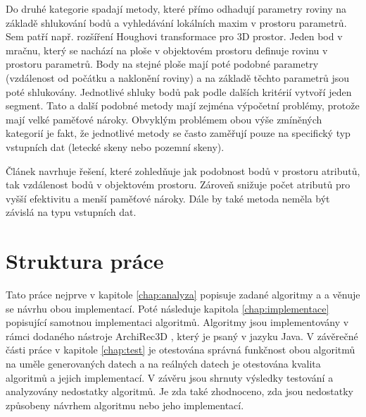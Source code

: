 \documentclass[11pt,twoside,a4paper]{book}
\begin{document}
Do druhé kategorie spadají metody, které přímo odhadují parametry roviny na základě shlukování bodů a vyhledávání lokálních maxim v prostoru parametrů. Sem patří např. rozšíření Houghovi transformace pro 3D prostor. Jeden bod v mračnu, který se nachází na ploše v objektovém prostoru definuje rovinu v prostoru parametrů. Body na stejné ploše mají poté podobné parametry (vzdálenost od počátku a naklonění roviny) a na základě těchto parametrů jsou poté shlukovány. Jednotlivé shluky bodů pak podle dalších kritérií vytvoří jeden segment. Tato a další podobné metody mají zejména výpočetní problémy, protože mají velké paměťové nároky. Obvyklým problémem obou výše zmíněných kategorií je fakt, že jednotlivé metody se často zaměřují pouze na specifický typ vstupních dat (letecké skeny nebo pozemní skeny).

Článek \cite{Seg01} navrhuje řešení, které zohledňuje jak podobnost bodů v prostoru atributů, tak vzdálenost bodů v objektovém prostoru. Zároveň snižuje počet atributů pro vyšší efektivitu a menší paměťové nároky. Dále by také metoda neměla být závislá na typu vstupních dat.


\section{Struktura práce}

Tato práce nejprve v kapitole \ref{chap:analyza} popisuje zadané algoritmy \cite{Seg01} a \cite{Seg02} a věnuje se návrhu obou implementací. Poté následuje kapitola \ref{chap:implementace} popisující samotnou implementaci algoritmů. Algoritmy jsou implementovány v rámci dodaného nástroje ArchiRec3D \cite{AR3D}, který je psaný v jazyku Java. V závěrečné části práce v kapitole \ref{chap:test} je otestována správná funkčnost obou algoritmů na uměle generovaných datech a na reálných datech je otestována kvalita algoritmů a jejich implementací. V závěru jsou  shrnuty výsledky testování a analyzovány nedostatky algoritmů. Je zda také zhodnoceno, zda jsou nedostatky způsobeny návrhem algoritmu nebo jeho implementací.



\end{document}
